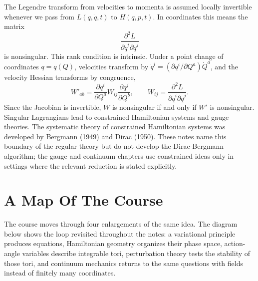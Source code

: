 \begin{hypothesis}
The Legendre transform from velocities to momenta is assumed locally invertible
whenever we pass from \(L(q,\dot q,t)\) to \(H(q,p,t)\). In coordinates this
means the matrix
\[
  \frac{\partial^2L}{\partial \dot q^i\partial \dot q^j}
\]
is nonsingular. This rank condition is intrinsic. Under a point change of
coordinates \(q=q(Q)\), velocities transform by
\(\dot q^i=(\partial q^i/\partial Q^a)\dot Q^a\), and the velocity Hessian
transforms by congruence,
\[
  W'_{ab}
  =
  \frac{\partial q^i}{\partial Q^a}
  W_{ij}
  \frac{\partial q^j}{\partial Q^b},
  \qquad
  W_{ij}=\frac{\partial^2L}{\partial\dot q^i\partial\dot q^j}.
\]
Since the Jacobian is invertible, \(W\) is nonsingular if and only if \(W'\)
is nonsingular. Singular Lagrangians lead to constrained Hamiltonian systems and
gauge theories. The systematic theory of constrained Hamiltonian systems was
developed by Bergmann (1949) and Dirac (1950). These notes name this boundary
of the regular theory but do not develop the Dirac-Bergmann algorithm; the
gauge and continuum chapters use constrained ideas only in settings where the
relevant reduction is stated explicitly.
\end{hypothesis}

\section{A Map Of The Course}
\label{sec:course-map}

The course moves through four enlargements of the same idea. The diagram below
shows the loop revisited throughout the notes: a variational principle produces
equations, Hamiltonian geometry organizes their phase space, action-angle
variables describe integrable tori, perturbation theory tests the stability of
those tori, and continuum mechanics returns to the same questions with fields
instead of finitely many coordinates.

